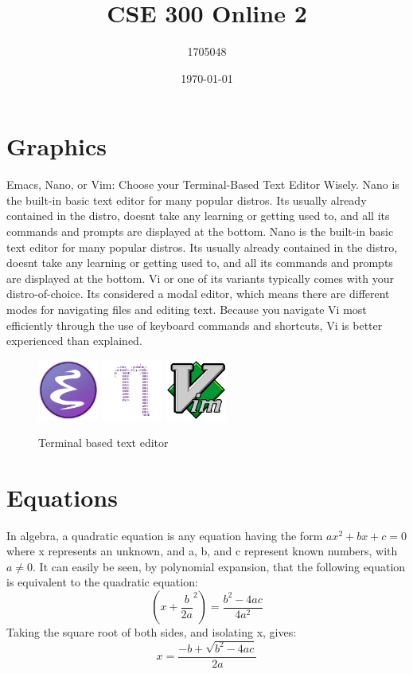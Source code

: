 \documentclass[14pt]{article}
\title{CSE 300 Online 2}
\author{1705048}
\date{\today}
\begin{document}
\maketitle
\section{Graphics}
Emacs, Nano, or Vim: Choose your Terminal-Based Text Editor Wisely. Nano
is the built-in basic text editor for many popular distros. Its usually already
contained in the distro, doesnt take any learning or getting used to, and all
its commands and prompts are displayed at the bottom. Nano is the built-in
basic text editor for many popular distros. Its usually already contained in the
distro, doesnt take any learning or getting used to, and all its commands and
prompts are displayed at the bottom. Vi or one of its variants typically comes
with your distro-of-choice. Its considered a modal editor, which means there
are different modes for navigating files and editing text. Because you navigate
Vi most efficiently through the use of keyboard commands and shortcuts, Vi is
better experienced than explained.
\begin{figure}[H]
	\centering
	\includegraphics[width=2cm,height=2cm,scale=0.4]{emacslogo.png}
	\includegraphics[width=2cm,height=2cm,scale=0.4]{nanologo.png}
	\includegraphics[width=2cm,height=2cm,scale=0.4]{vimlogo.png}
	\caption{Terminal based text editor}
\end{figure}
\section{Equations}
In algebra, a quadratic equation is any equation having the form $ax^2+bx+c = 0$ where x represents an unknown, and a, b, and c represent known numbers, with $a \neq 0$. It can easily be seen, by polynomial expansion, that the following equation is equivalent to the quadratic equation:
$$\left({x+\frac{b}{2a}}^2\right)=\frac{b^2-4ac}{4a^2}$$
\pagebreak
\newpage
Taking the square root of both sides, and isolating x, gives:
\begin{equation}
x=\frac{-b+\sqrt{b^2-4ac}}{2a}
\end{equation}
\end{document}
